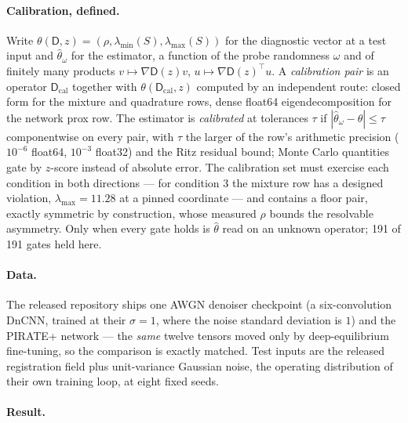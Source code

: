 \documentclass[11pt]{article}
\newcommand{\D}{\mathsf{D}}
\begin{document}
\paragraph{Calibration, defined.} Write $\theta(\D, z) = (\rho, \lambda_{\min}(S), \lambda_{\max}(S))$ for the diagnostic vector at a test input and $\widehat\theta_\omega$ for the estimator, a function of the probe randomness $\omega$ and of finitely many products $v \mapsto \nabla\D(z)v$, $u \mapsto \nabla\D(z)^\top u$. A \emph{calibration pair} is an operator $\D_{\mathrm{cal}}$ together with $\theta(\D_{\mathrm{cal}}, z)$ computed by an independent route: closed form for the mixture and quadrature rows, dense float64 eigendecomposition for the network prox row. The estimator is \emph{calibrated} at tolerances $\tau$ if $|\widehat\theta_\omega - \theta| \le \tau$ componentwise on every pair, with $\tau$ the larger of the row's arithmetic precision ($10^{-6}$ float64, $10^{-3}$ float32) and the Ritz residual bound; Monte Carlo quantities gate by $z$-score instead of absolute error. The calibration set must exercise each condition in both directions --- for condition 3 the mixture row has a designed violation, $\lambda_{\max} = 11.28$ at a pinned coordinate --- and contains a floor pair, exactly symmetric by construction, whose measured $\rho$ bounds the resolvable asymmetry. Only when every gate holds is $\widehat\theta$ read on an unknown operator; 191 of 191 gates held here.

\paragraph{Data.} The released repository ships one AWGN denoiser checkpoint (a six-convolution DnCNN, trained at their $\sigma = 1$, where the noise standard deviation is $1$) and the PIRATE+ network --- the \emph{same} twelve tensors moved only by deep-equilibrium fine-tuning, so the comparison is exactly matched. Test inputs are the released registration field plus unit-variance Gaussian noise, the operating distribution of their own training loop, at eight fixed seeds.

\paragraph{Result.}
\end{document}
